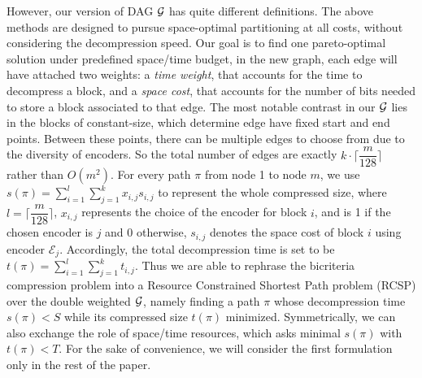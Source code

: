 \documentclass{sig-alternate-05-2015}
\begin{document}
However, our version of DAG $ \cal G $ has quite different definitions.
The above methods are designed to pursue space-optimal partitioning at all costs, without considering the decompression speed.
Our goal is to find one pareto-optimal solution under predefined space/time budget, in the new graph, each edge will have attached two weights: a \textit{time weight}, that accounts for the time to decompress a block, and a \textit{space cost}, that accounts for the number of bits needed to store a block associated to that edge.
The most notable contrast in our $ \cal G $ lies in the blocks of constant-size, which determine edge have fixed start and end points.
Between these points, there can be multiple edges to choose from due to the diversity of encoders.
So the total number of edges are exactly $ k \cdot \lceil \dfrac{m}{128} \rceil  $ rather than $ O(m^2) $.
For every path $ \pi $ from node 1 to node $ m $, we use $ s(\pi) = \sum_{i=1}^{l}\sum_{j=1}^{k}x_{i,j}s_{i,j} $ to represent the whole compressed size, where $ l= \lceil \dfrac{m}{128} \rceil$, $ x_{i,j} $ represents the choice of the encoder for block $ i $, and is 1 if the chosen encoder is $ j $ and 0 otherwise, $ s_{i,j} $ denotes the space cost of block $ i $ using encoder $ \mathcal{E}_j $.
Accordingly, the total decompression time is set to be $ t(\pi) = \sum_{i=1}^{l}\sum_{j=1}^{k}t_{i,j} $.
Thus we are able to rephrase the bicriteria compression problem into a Resource Constrained Shortest Path problem (RCSP) over the double weighted $ \cal G $, namely finding a path $ \pi $ whose decompression time $ s(\pi) < S $ while its compressed size $ t(\pi) $ minimized.
Symmetrically, we can also exchange the role of space/time resources, which asks minimal $ s(\pi) $ with $ t(\pi) < T $.
For the sake of convenience, we will consider the first formulation only in the rest of the paper. 
\end{document}
